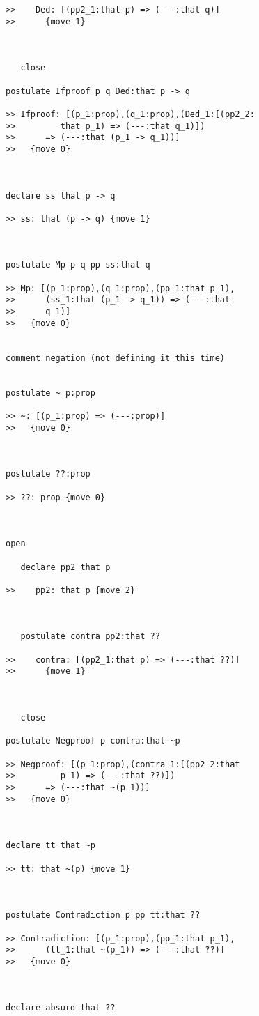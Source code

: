 \begin{verbatim}
>>    Ded: [(pp2_1:that p) => (---:that q)]
>>      {move 1}



   close

postulate Ifproof p q Ded:that p -> q

>> Ifproof: [(p_1:prop),(q_1:prop),(Ded_1:[(pp2_2:
>>         that p_1) => (---:that q_1)])
>>      => (---:that (p_1 -> q_1))]
>>   {move 0}



declare ss that p -> q

>> ss: that (p -> q) {move 1}



postulate Mp p q pp ss:that q

>> Mp: [(p_1:prop),(q_1:prop),(pp_1:that p_1),
>>      (ss_1:that (p_1 -> q_1)) => (---:that
>>      q_1)]
>>   {move 0}


comment negation (not defining it this time)


postulate ~ p:prop

>> ~: [(p_1:prop) => (---:prop)]
>>   {move 0}



postulate ??:prop

>> ??: prop {move 0}



open

   declare pp2 that p

>>    pp2: that p {move 2}



   postulate contra pp2:that ??

>>    contra: [(pp2_1:that p) => (---:that ??)]
>>      {move 1}



   close

postulate Negproof p contra:that ~p

>> Negproof: [(p_1:prop),(contra_1:[(pp2_2:that
>>         p_1) => (---:that ??)])
>>      => (---:that ~(p_1))]
>>   {move 0}



declare tt that ~p

>> tt: that ~(p) {move 1}



postulate Contradiction p pp tt:that ??

>> Contradiction: [(p_1:prop),(pp_1:that p_1),
>>      (tt_1:that ~(p_1)) => (---:that ??)]
>>   {move 0}



declare absurd that ??


\end{verbatim}
